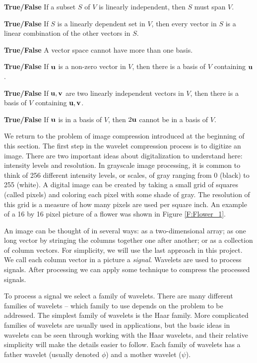 \item \textbf{True/False} If a subset $S$ of $V$ is linearly independent, then $S$ must span $V$. 

\item \textbf{True/False} If $S$ is a linearly dependent set in $V$, then every vector in $S$ is a linear combination of the other vectors in $S$. 

\item \textbf{True/False} A vector space cannot have more than one basis.

\item \textbf{True/False} If $\mathbf{u}$ is a non-zero vector in $V$, then there is a basis of $V$ containing $\mathbf{u}$.

\item \textbf{True/False} If $\mathbf{u}, \mathbf{v}$ are two linearly independent vectors in $V$, then there is a basis of $V$ containing $\mathbf{u}, \mathbf{v}$. 

\item \textbf{True/False} If $\mathbf{u}$ is in a basis of $V$, then $2\mathbf{u}$ cannot be in a basis of $V$.

\ea	

\ee

\label{sec:proj_img_compress}

We return to the problem of image compression introduced at the beginning of this section. The first step in the wavelet compression process is to digitize an image. There are two important ideas about digitalization to understand here:  intensity levels and resolution.  In grayscale image processing, it is common to think of 256 different intensity levels, or scales, of gray ranging from 0 (black) to 255 (white).  A digital image can be created by taking a small grid of squares (called pixels) and coloring each pixel with some shade of gray.  The resolution of this grid is a measure of how many pixels are used per square inch.  An example of a 16 by 16 pixel picture of a flower was shown in Figure \ref{F:Flower_1}.

An image can be thought of in several ways: as a two-dimensional array; as one long vector by stringing the columns together one after another; or as a collection of column vectors. For simplicity, we will use the last approach in this project. We call each column vector in a picture a \emph{signal}. Wavelets are used to process signals. After processing we can apply some technique to compress the processed signals. 

To process a signal we select a family of wavelets. There are many different families of wavelets -- which family to use depends on the problem to be addressed. The simplest family of wavelets is the Haar family. More complicated families of wavelets are usually used in applications, but the basic ideas in wavelets can be seen through working with the Haar wavelets, and their relative simplicity will make the details easier to follow. Each family of wavelets has a father wavelet (usually denoted $\phi$) and a mother wavelet ($\psi$).

